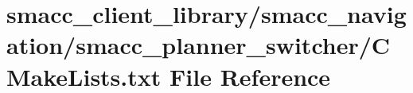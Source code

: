 \hypertarget{client__library_2smacc__navigation_2smacc__planner__switcher_2CMakeLists_8txt}{}\section{smacc\+\_\+client\+\_\+library/smacc\+\_\+navigation/smacc\+\_\+planner\+\_\+switcher/\+C\+Make\+Lists.txt File Reference}
\label{client__library_2smacc__navigation_2smacc__planner__switcher_2CMakeLists_8txt}
